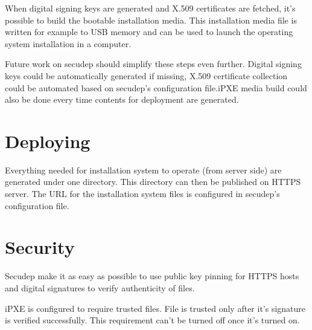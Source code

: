 When digital signing keys are generated and X.509 certificates are
fetched, it's possible to build the bootable installation media. This
installation media file is written for example to USB memory and can
be used to launch the operating system installation in a computer.

Future work on secudep should simplify these steps even further.
Digital signing keys could be automatically generated if missing,
X.509 certificate collection could be automated based on secudep's
configuration file.\@ iPXE media build could also be done every time
contents for deployment are generated.

\section{Deploying}

Everything needed for installation system to operate (from server
side) are generated under one directory. This directory can then be
published on HTTPS server. The URL for the installation system files
is configured in secudep's configuration file.

\section{Security}

Secudep make it as easy as possible to use public key pinning for
HTTPS hosts and digital signatures to verify authenticity of files.

iPXE is configured to require trusted files. File is trusted only
after it's signature is verified successfully. This requirement can't
be turned off once it's turned on.
